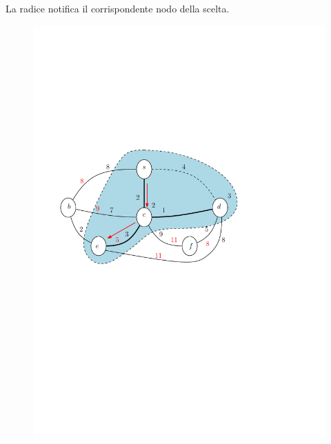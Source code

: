 \documentclass[10pt,xcolor=dvipsnames]{beamer}
\begin{document}
\begin{frame}
	\frametitle{}
	La radice notifica il corrispondente nodo della scelta.
	\begin{figure}[h]
	\centering
		\includegraphics[scale=0.6]{PT4.pdf}
	\end{figure}
\end{frame}
\end{document}
